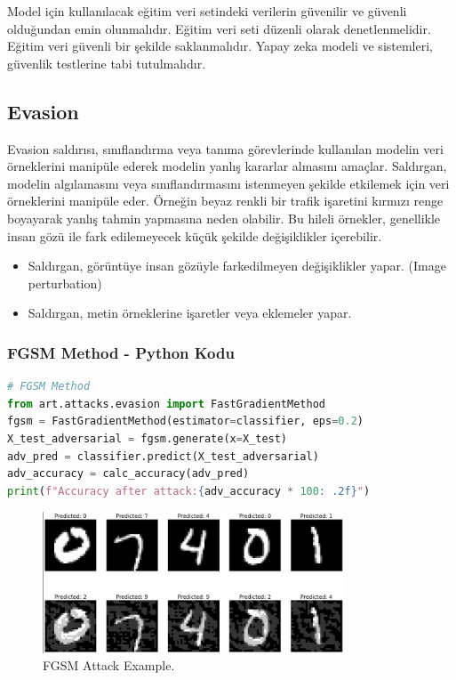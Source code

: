 Model için kullanılacak eğitim veri setindeki verilerin güvenilir ve güvenli olduğundan emin olunmalıdır. Eğitim veri seti düzenli olarak denetlenmelidir. Eğitim veri güvenli bir şekilde saklanmalıdır. Yapay zeka modeli ve sistemleri, güvenlik testlerine tabi tutulmalıdır. 

\newpage

\subsection{Evasion}
Evasion saldırısı, sınıflandırma veya tanıma görevlerinde kullanılan modelin veri örneklerini manipüle ederek modelin yanlış kararlar almasını amaçlar. Saldırgan, modelin algılamasını veya sınıflandırmasını istenmeyen şekilde etkilemek için veri örneklerini manipüle eder. Örneğin beyaz renkli bir trafik işaretini kırmızı renge boyayarak yanlış tahmin yapmasına neden olabilir. Bu hileli örnekler, genellikle insan gözü ile fark edilemeyecek küçük şekilde değişiklikler içerebilir.
\begin{itemize}
    \item Saldırgan, görüntüye insan gözüyle farkedilmeyen değişiklikler yapar. (Image perturbation)
    \item Saldırgan, metin örneklerine işaretler veya eklemeler yapar.
\end{itemize}

\subsubsection{FGSM Method - Python Kodu}

\begin{lstlisting}[language=Python]
# FGSM Method
from art.attacks.evasion import FastGradientMethod
fgsm = FastGradientMethod(estimator=classifier, eps=0.2)
X_test_adversarial = fgsm.generate(x=X_test)
adv_pred = classifier.predict(X_test_adversarial)
adv_accuracy = calc_accuracy(adv_pred)
print(f"Accuracy after attack:{adv_accuracy * 100: .2f}")
\end{lstlisting}

\begin{figure}[h]
  \centering
  \includegraphics[width=0.8\textwidth]{images/evasion_fgsm.png}
  \caption{FGSM Attack Example.}
\end{figure}

